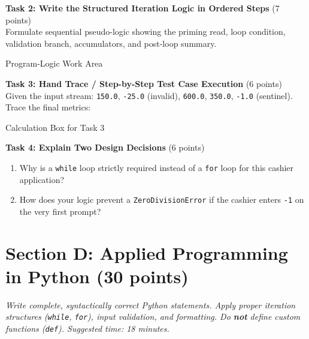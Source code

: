 \documentclass[11pt,a4paper]{article}
\begin{document}
\vspace{0.5mm}
\textbf{Task 2: Write the Structured Iteration Logic in Ordered Steps} (7 points)\\
Formulate sequential pseudo-logic showing the priming read, loop condition, validation branch, accumulators, and post-loop summary.

\begin{answerbox}[height=5.2cm]{Program-Logic Work Area}
\end{answerbox}

\vspace{0.5mm}
\textbf{Task 3: Hand Trace / Step-by-Step Test Case Execution} (6 points)\\
Given the input stream: \texttt{150.0}, \texttt{-25.0} (invalid), \texttt{600.0}, \texttt{350.0}, \texttt{-1.0} (sentinel). Trace the final metrics:

\begin{answerbox}[height=3.5cm]{Calculation Box for Task 3}
\end{answerbox}

\vspace{0.5mm}
\textbf{Task 4: Explain Two Design Decisions} (6 points)
\begin{enumerate}[label=\alph*),leftmargin=2em]
  \item Why is a \texttt{while} loop strictly required instead of a \texttt{for} loop for this cashier application?\\[3.5mm]
  \hrulefill
  \item How does your logic prevent a \texttt{ZeroDivisionError} if the cashier enters \texttt{-1} on the very first prompt?\\[3.5mm]
  \hrulefill
\end{enumerate}

\newpage


\section*{Section D: Applied Programming in Python \hfill \normalsize\normalfont(30 points)}
\textit{Write complete, syntactically correct Python statements. Apply proper iteration structures (\texttt{while}, \texttt{for}), input validation, and formatting. Do \textbf{not} define custom functions (\texttt{def}). Suggested time: 18 minutes.}
\end{document}
